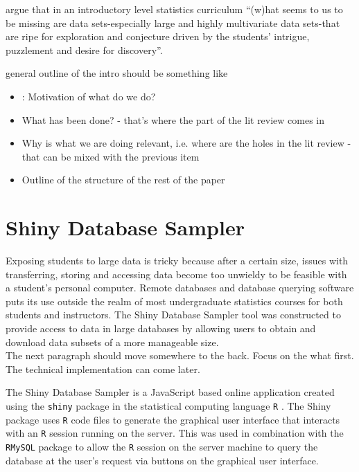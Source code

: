 \documentclass{article}\usepackage[]{graphicx}\usepackage[]{color}
\newcommand{\hh}[1]{{\color{ForestGreen} #1}}
\begin{document}
\citet[][p.~1]{Finzer2007} argue that in an introductory level statistics curriculum ``(w)hat seems to us to be missing are data sets-especially large and highly multivariate data sets-that are ripe for exploration and conjecture driven by the students' intrigue, puzzlement and desire for discovery''.\\

\hh{general outline of the intro should be something like
\begin{itemize}
\item: Motivation of what do we do?
\item What has been done? - that's where the part of the lit review comes in
\item Why is what we are doing relevant, i.e. where are the holes in the lit review - that can be mixed with the previous item
\item Outline of the structure of the rest of the paper
\end{itemize}}

\section{Shiny Database Sampler}

Exposing students to large data is tricky because after a certain size, issues with transferring, storing and accessing data become too unwieldy to be feasible with a student's personal computer.  Remote databases and database querying software puts its use outside the realm of most undergraduate statistics courses for both students and instructors.  
The Shiny Database Sampler tool was constructed to provide access to data in large databases 
by allowing users to obtain and download data subsets of a more manageable size.\\

\hh{The next paragraph should move somewhere to the back. Focus on the what first. The technical implementation can come later.}

The Shiny Database Sampler is a JavaScript based online application created using the \texttt{shiny} package \citep{shiny} in the statistical computing language \texttt{R} \citep{R}. The Shiny package uses \texttt{R} code files to generate the graphical user interface that interacts with an \texttt{R} session running on the server.  This was used in combination with the \texttt{RMySQL} package \citep{RMySQL} to allow the \texttt{R} session on the server machine to query the database at the user's request via buttons on the graphical user interface.  \\  
\end{document}
